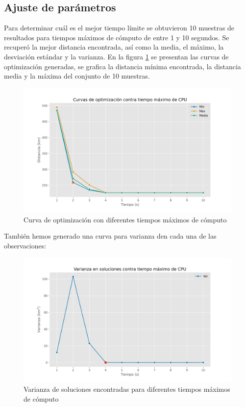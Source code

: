 \documentclass[journal]{IEEEtran}
\begin{document}
        \subsection{Ajuste de parámetros} \label{sec:parameter-tuning}
            
            Para determinar cuál es el mejor tiempo límite se obtuvieron 10 muestras de resultados para tiempos máximos de cómputo de entre 1 y 10 segundos. Se recuperó la mejor distancia encontrada, así como la media, el máximo, la desviación estándar y la varianza. En la figura \ref{fig:optim-curves} se presentan las curvas de optimización generadas, se grafica la distancia mínima encontrada, la distancia media y la máxima del conjunto de 10 muestras.
            \begin{figure}[h!]
                \centering
                \includegraphics[scale=0.35]{../img/curvas-opt.png}
                \caption{Curva de optimización con diferentes tiempos máximos de cómputo}
                \label{fig:optim-curves}
            \end{figure}

            También hemos generado una curva para varianza den cada una de las observaciones:

            \begin{figure}[h!]
                \centering
                \includegraphics[scale=0.35]{../img/varianza-opt.png}
                \caption{Varianza de soluciones encontradas para diferentes tiempos máximos de cómputo}
                \label{fig:optim-var}
            \end{figure}
\end{document}
